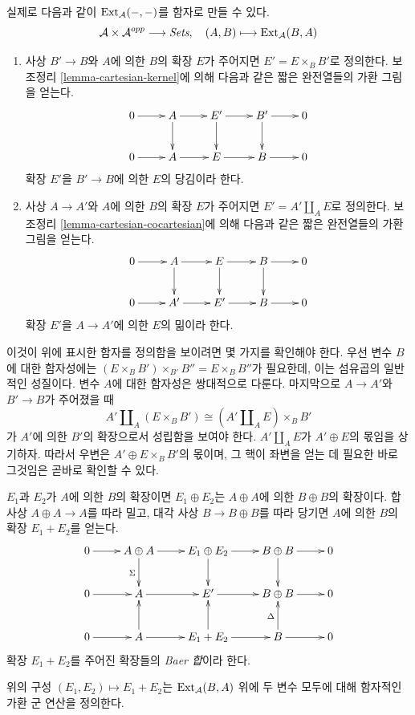 \medskip\noindent
실제로 다음과 같이 $\mathop{\mathrm{Ext}}\nolimits_\mathcal{A}(-, -)$를 함자로 만들 수 있다.
$$
\mathcal{A} \times \mathcal{A}^{opp} \longrightarrow \textit{Sets}, \quad
(A, B) \longmapsto \mathop{\mathrm{Ext}}\nolimits_\mathcal{A}(B, A)
$$
\begin{enumerate}
\item 사상 $B' \to B$와 $A$에 의한 $B$의 확장 $E$가 주어지면
$E' = E \times_B B'$로 정의한다. 보조정리
\ref{lemma-cartesian-kernel}에 의해 다음과 같은 짧은 완전열들의 가환
그림을 얻는다.
$$
\xymatrix{
0 \ar[r] & A \ar[r] \ar[d] & E' \ar[r] \ar[d] & B' \ar[r] \ar[d] & 0 \\
0 \ar[r] & A \ar[r] & E \ar[r] & B \ar[r] & 0
}
$$
확장 $E'$을 {$B' \to B$에 의한 $E$의 당김}이라 한다.
\item 사상 $A \to A'$와 $A$에 의한 $B$의 확장 $E$가 주어지면
$E' = A' \amalg_A E$로 정의한다. 보조정리
\ref{lemma-cartesian-cocartesian}에 의해 다음과 같은 짧은 완전열들의
가환 그림을 얻는다.
$$
\xymatrix{
0 \ar[r] & A \ar[r] \ar[d] & E \ar[r] \ar[d] & B \ar[r] \ar[d] & 0 \\
0 \ar[r] & A' \ar[r] & E' \ar[r] & B \ar[r] & 0
}
$$
확장 $E'$을 {$A \to A'$에 의한 $E$의 밂}이라 한다.
\end{enumerate}
이것이 위에 표시한 함자를 정의함을 보이려면 몇 가지를 확인해야 한다.
우선 변수 $B$에 대한 함자성에는
$(E \times_B B') \times_{B'} B'' = E \times_B B''$가 필요한데,
이는 섬유곱의 일반적인 성질이다. 변수 $A$에 대한 함자성은 쌍대적으로
다룬다. 마지막으로 $A \to A'$와 $B' \to B$가 주어졌을 때
$$
A' \amalg_A (E \times_B B')
\cong
(A' \amalg_A E)\times_B B'
$$
가 $A'$에 의한 $B'$의 확장으로서 성립함을 보여야 한다.
$A' \amalg_A E$가 $A' \oplus E$의 몫임을 상기하자. 따라서 우변은
$A' \oplus E \times_B B'$의 몫이며, 그 핵이 좌변을 얻는 데 필요한
바로 그것임은 곧바로 확인할 수 있다.

\medskip\noindent
$E_1$과 $E_2$가 $A$에 의한 $B$의 확장이면 $E_1\oplus E_2$는
$A\oplus A$에 의한 $B \oplus B$의 확장이다. 합 사상
$A \oplus A \to A$를 따라 밀고, 대각 사상 $B \to B \oplus B$를 따라
당기면 $A$에 의한 $B$의 확장 $E_1 + E_2$를 얻는다.
$$
\xymatrix{
0 \ar[r] &
A \oplus A \ar[r] \ar[d]_\Sigma &
E_1 \oplus E_2 \ar[r] \ar[d] &
B \oplus B \ar[r] \ar[d] &
0 \\
0 \ar[r] &
A \ar[r] &
E' \ar[r] &
B \oplus B \ar[r] &
0\\
0 \ar[r] &
A \ar[r] \ar[u] &
E_1 + E_2 \ar[r] \ar[u] &
B \ar[r] \ar[u]^\Delta &
0
}
$$
확장 $E_1 + E_2$를 주어진 확장들의 {\it Baer 합}이라 한다.

\begin{lemma}
\label{lemma-baer-sum}
위의 구성 $(E_1, E_2) \mapsto E_1 + E_2$는
$\mathop{\mathrm{Ext}}\nolimits_\mathcal{A}(B, A)$ 위에 두 변수 모두에 대해 함자적인 가환 군 연산을
정의한다.
\end{lemma}

